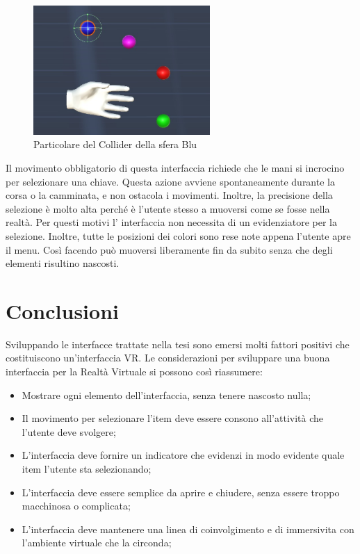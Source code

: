 \documentclass[target=bach,aauheader=]{thud}
\begin{document}
\begin{figure}[h]
    \centering
    \includegraphics[width=0.60\textwidth]{coll}
    \caption{Particolare del Collider della sfera Blu}
    \label{fig:coll}
\end{figure}

\newpage
Il movimento obbligatorio di questa interfaccia richiede che le mani si incrocino per selezionare una chiave.
Questa azione avviene spontaneamente durante la corsa o la camminata, e non ostacola i movimenti.
Inoltre, la precisione della selezione è molto alta perché è l'utente stesso a muoversi come se fosse nella realtà.
Per questi motivi l' interfaccia non necessita di un evidenziatore per la selezione.
Inoltre, tutte le posizioni dei colori sono rese note appena l'utente apre il menu.
Così facendo può muoversi liberamente fin da subito senza che degli elementi risultino nascosti. 


\chapter{Conclusioni} %
Sviluppando le interfacce trattate nella tesi sono emersi molti fattori positivi che costituiscono un'interfaccia VR.
Le considerazioni per sviluppare una buona interfaccia per la Realtà Virtuale si possono così riassumere:
\begin{itemize}
    \item Mostrare ogni elemento dell'interfaccia, senza tenere nascosto nulla;
    \item Il movimento per selezionare l'item deve essere consono all'attività che l'utente deve svolgere;
    \item L'interfaccia deve fornire un indicatore che evidenzi in modo evidente quale item l'utente sta selezionando;
    \item L'interfaccia deve essere semplice da aprire e chiudere, senza essere troppo macchinosa o complicata;
    \item L'interfaccia deve mantenere una linea di coinvolgimento e di immersivita con l'ambiente virtuale che la circonda; \\
\end{itemize}
\end{document}
